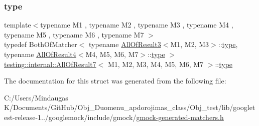 \subsubsection{\texorpdfstring{type}{type}}
{\footnotesize\ttfamily template$<$typename M1 , typename M2 , typename M3 , typename M4 , typename M5 , typename M6 , typename M7 $>$ \\
typedef Both\+Of\+Matcher$<$ typename \mbox{\hyperlink{structtesting_1_1internal_1_1_all_of_result3}{All\+Of\+Result3}}$<$M1, M2, M3$>$\+::\mbox{\hyperlink{structtesting_1_1internal_1_1_all_of_result7_a47ab0d670258434b0e65530591948e8c}{type}}, typename \mbox{\hyperlink{structtesting_1_1internal_1_1_all_of_result4}{All\+Of\+Result4}}$<$M4, M5, M6, M7$>$\+::\mbox{\hyperlink{structtesting_1_1internal_1_1_all_of_result7_a47ab0d670258434b0e65530591948e8c}{type}} $>$ \mbox{\hyperlink{structtesting_1_1internal_1_1_all_of_result7}{testing\+::internal\+::\+All\+Of\+Result7}}$<$ M1, M2, M3, M4, M5, M6, M7 $>$\+::\mbox{\hyperlink{structtesting_1_1internal_1_1_all_of_result7_a47ab0d670258434b0e65530591948e8c}{type}}}



The documentation for this struct was generated from the following file\+:\begin{DoxyCompactItemize}
\item 
C\+:/\+Users/\+Mindaugas K/\+Documents/\+Git\+Hub/\+Obj\+\_\+\+Duomenu\+\_\+apdorojimas\+\_\+class/\+Obj\+\_\+test/lib/googletest-\/release-\/1../googlemock/include/gmock/\mbox{\hyperlink{_obj__test_2lib_2googletest-release-1_88_81_2googlemock_2include_2gmock_2gmock-generated-matchers_8h}{gmock-\/generated-\/matchers.\+h}}\end{DoxyCompactItemize}
